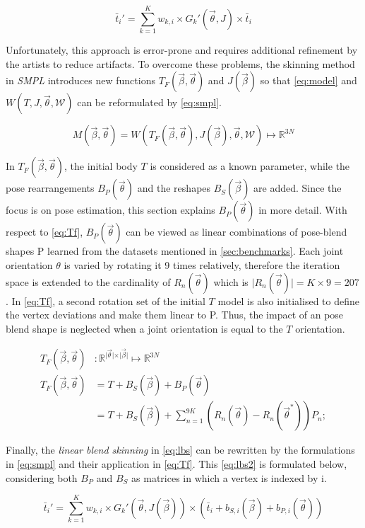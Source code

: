 \begin{equation}
\label{eq:lbs}
\bar{t}_{i}' = \sum_{k=1}^{K} w_{k,i} \times G_{k}'(\vec{\theta},J) \times \bar{t}_{i}
\end{equation}

Unfortunately, this approach is error-prone and requires additional refinement by the artists to reduce artifacts. To overcome these problems, the skinning method in \emph{SMPL} introduces new functions $T_{F}(\vec{\beta},\vec{\theta})$ and $J(\vec{\beta})$ so that \autoref{eq:model} and $W(T,J,\vec{\theta},\mathcal{W})$ can be reformulated by \autoref{eq:smpl}.

\begin{equation}
\label{eq:smpl}
M(\vec{\beta},\vec{\theta}) = W(T_{F}(\vec{\beta},\vec{\theta}),J(\vec{\beta}),\vec{\theta},\mathcal{W}) \mapsto \mathbb{R}^{3N}
\end{equation}

In $T_{F}(\vec{\beta},\vec{\theta})$, the initial body $T$ is considered as a known parameter, while the pose rearrangements $B_{P}(\vec{\theta})$ and the reshapes $B_{S}(\vec{\beta})$ are added. Since the focus is on pose estimation, this section explains $B_{P}(\vec{\theta})$ in more detail. With respect to \autoref{eq:Tf}, $B_{P}(\vec{\theta})$ can be viewed as linear combinations of pose-blend shapes P learned from the datasets mentioned in \autoref{sec:benchmarks}. Each joint orientation $\theta$ is varied by rotating it 9 times relatively, therefore the iteration space is extended to the cardinality of $R_{n}(\vec{\theta})$ which is $\vert R_{n}(\vec{\theta}) \vert = K \times 9 = 207$. In \autoref{eq:Tf}, a second rotation set of the initial $T$ model is also initialised to define the vertex deviations and make them linear to P. Thus, the impact of an pose blend shape is neglected when a joint orientation is equal to the $T$ orientation.

\begin{equation}
\label{eq:Tf}
	\begin{split}
		T_{F}(\vec{\beta},\vec{\theta})&: \mathbb{R}^{\vert \vec{\theta} 			\vert \times \vert \vec{\beta} \vert} \mapsto \mathbb{R}^{3N} \\
		T_{F}(\vec{\beta},\vec{\theta}) &= T + B_{S}(\vec{\beta}) + B_{P}				(\vec{\theta}) \\
		&= T + B_{S}(\vec{\beta}) + \sum_{n=1}^{9K} (R_{n}(\vec{\theta}) - 				R_{n}(\vec{\theta}^{*}))P_{n};
	\end{split}
\end{equation}

Finally, the \emph{linear blend skinning} in \autoref{eq:lbs} can be rewritten by the formulations in \autoref{eq:smpl} and their application in \autoref{eq:Tf}. This \autoref{eq:lbs2} is formulated below, considering both $B_{P}$ and $B_{S}$ as matrices in which a vertex is indexed by i. \cite{smpl}

\begin{equation}
\label{eq:lbs2}
\bar{t}_{i}' = \sum_{k=1}^{K} w_{k,i} \times G_{k}'(\vec{\theta},J(\vec{\beta})) \times (\bar{t}_{i} + b_{S,i}(\vec{\beta}) +b_{P,i}(\vec{\theta}))
\end{equation}

